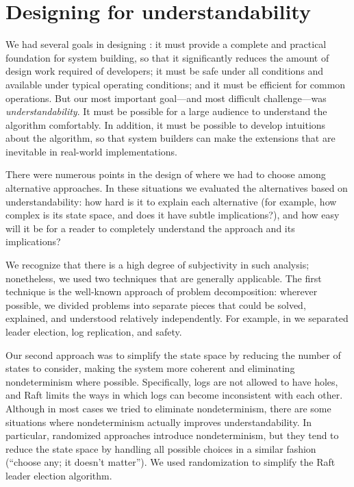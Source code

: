 \section{Designing for understandability}
\label{basicraft:understandability}

We had several goals in designing \name{}: it must provide a complete
and practical foundation for system building, so that it
significantly reduces the amount of design work required of developers;
it must be safe under all conditions and available under
typical operating conditions; and it must be efficient for
common operations. But our most important goal---and most difficult
challenge---was \emph{understandability}. It must be possible
for a large audience to understand the algorithm comfortably.
In addition, it must be possible to develop intuitions
about the algorithm, so that system builders can make the
extensions that are inevitable in real-world implementations.

There were numerous points in the design of \name{} where we had to
choose among alternative approaches. In these situations we evaluated
the alternatives based on understandability: how hard is it to explain
each alternative (for example, how complex is its state space, and
does it have subtle implications?), and how easy will it be for a reader
to completely understand the approach and its implications?

We recognize that there is a high degree of subjectivity in such
analysis; nonetheless, we used two techniques that
are generally applicable. The first technique is the well-known approach
of problem decomposition: wherever possible, we divided problems
into separate pieces that could be solved, explained, and understood
relatively independently. For example, in \name{} we separated
leader election, log replication, and safety.

Our second approach was to simplify the state space by reducing the
number of states to consider, making the system
more coherent and eliminating nondeterminism where possible.
Specifically, logs are not allowed to have holes, and Raft limits the
ways in which logs can become inconsistent with each other.
Although in most cases we tried to eliminate nondeterminism, there are
some situations where nondeterminism actually improves understandability.
In particular, randomized approaches introduce nondeterminism, but
they tend to reduce the state space by handling all possible choices
in a similar fashion (``choose any; it doesn't matter''). We used
randomization to simplify the Raft leader election algorithm.
